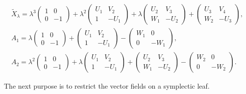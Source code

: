 \documentclass[pdftex]{sigma}
\numberwithin{equation}{section}
\begin{document}
\begin{gather*}
\widetilde{X}_\lambda = \lambda ^3 \left(
\begin{matrix}
1 & 0 \\
0 & -1
\end{matrix}
\right) + \lambda^2 \left(
\begin{matrix}
U_1 & V_2 \\
1 & -U_1
\end{matrix}
\right) + \lambda \left(
\begin{matrix}
U_2 & V_3 \\
W_1 & -U_2
\end{matrix}
\right) + \left(
\begin{matrix}
U_3 & V_4 \\
W_2 & -U_3
\end{matrix}
\right), \\
A_1 = \lambda \left(
\begin{matrix}
1 & 0 \\
0 & -1
\end{matrix}
\right) + \left(
\begin{matrix}
U_1 & V_2 \\
1 & -U_1
\end{matrix}
\right) - \left(
\begin{matrix}
W_1 & 0 \\
0 & -W_1
\end{matrix}
\right), \\
A_2 = \lambda^2 \left(
\begin{matrix}
1 & 0 \\
0 & -1
\end{matrix}
\right) + \lambda \left(
\begin{matrix}
U_1 & V_2 \\
1 & -U_1
\end{matrix}
\right) + \left(
\begin{matrix}
U_2 & V_3 \\
W_1 & -U_2
\end{matrix}
\right)
 - \left(
\begin{matrix}
W_2 & 0 \\
0 & -W_2
\end{matrix}
\right).
\end{gather*}

The next purpose is to restrict the vector f\/ields on a symplectic leaf.
\end{document}
